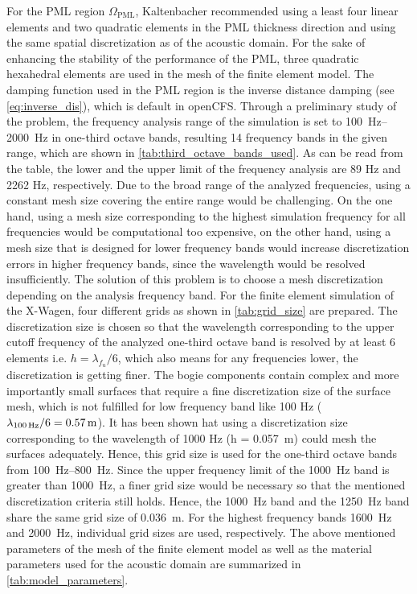 For the PML region $\Omega_{\text{PML}}$, Kaltenbacher \cite{KALTENBACHER_PML_2013} recommended using a least four linear elements and two quadratic elements in the PML thickness direction and using the same spatial discretization as of the acoustic domain. For the sake of enhancing the stability of the performance of the PML, three quadratic hexahedral elements are used in the mesh of the finite element model. The damping function used in the PML region is the inverse distance damping (see \cref{eq:inverse_dis}), which is default in openCFS.
Through a preliminary study of the problem, the frequency analysis range of the simulation is set to \SIrange{100}{2000}{\hertz} in one-third octave bands, resulting 14 frequency bands in the given range, which are shown in \cref{tab:third_octave_bands_used}. As can be read from the table, the lower and the upper limit of the frequency analysis are 89 Hz and 2262 Hz, respectively. Due to the broad range of the analyzed frequencies, using a constant mesh size covering the entire range would be challenging. On the one hand, using a mesh size corresponding to the highest simulation frequency for all frequencies would be computational too expensive, on the other hand, using a mesh size that is designed for lower frequency bands would increase discretization errors in higher frequency bands, since the wavelength would be resolved insufficiently. The solution of this problem is to choose a mesh discretization depending on the analysis frequency band. For the finite element simulation of the X-Wagen, four different grids as shown in \cref{tab:grid_size} are prepared. The discretization size is chosen so that the wavelength corresponding to the upper cutoff frequency of the analyzed one-third octave band is resolved by at least 6 elements i.e. $h = \lambda_{f_u} / 6$, which also means for any frequencies lower, the discretization is getting finer. The bogie components contain complex and more importantly small surfaces that require a fine discretization size of the surface mesh, which is not fulfilled for low frequency band like 100 Hz ($\lambda_{\text{\SI{100}{\hertz}}} / 6 = 0.57\,\text{m}$). It has been shown hat using a discretization size corresponding to the wavelength of 1000 Hz (h = \SI{0.057}{\meter}) could mesh the surfaces adequately. Hence, this grid size is used for the one-third octave bands from \SIrange{100}{800}{\hertz}. Since the upper frequency limit of the \SI{1000}{\hertz} band is greater than \SI{1000}{\hertz}, a finer grid size would be necessary so that the mentioned discretization criteria still holds. Hence, the \SI{1000}{\hertz} band and the \SI{1250}{\hertz} band share the same grid size of \SI{0.036}{\meter}. For the highest frequency bands \SI{1600}{\hertz} and \SI{2000}{\hertz}, individual grid sizes are used, respectively.
The above mentioned parameters of the mesh of the finite element model as well as the material parameters used for the acoustic domain are summarized in \cref{tab:model_parameters}.

